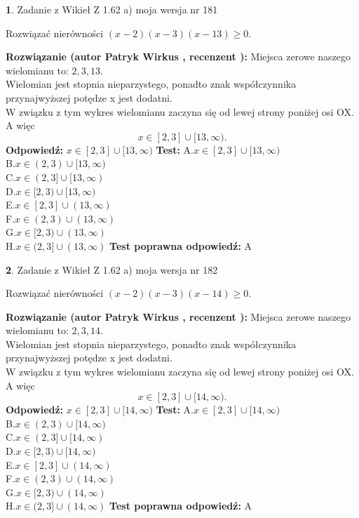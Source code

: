\documentclass[12pt, a4paper]{article}
\theoremstyle{definition} %
\newtheorem{zad}{}
\newcommand{\zadStart}[1]{\begin{zad}#1\newline}
\newcommand{\zadStop}{\end{zad}}
\newcommand{\rozwStart}[2]{\noindent \textbf{Rozwiązanie (autor #1 , recenzent #2): }\newline}
\newcommand{\rozwStop}{\newline}
\newcommand{\odpStart}{\noindent \textbf{Odpowiedź:}\newline}
\newcommand{\odpStop}{\newline}
\newcommand{\testStart}{\noindent \textbf{Test:}\newline}
\newcommand{\testStop}{\newline}
\newcommand{\kluczStart}{\noindent \textbf{Test poprawna odpowiedź:}\newline}
\newcommand{\kluczStop}{\newline}
\begin{document}
\zadStart{Zadanie z Wikieł Z 1.62 a) moja wersja nr 181}

Rozwiązać nierówności $(x-2)(x-3)(x-13)\ge0$.
\zadStop
\rozwStart{Patryk Wirkus}{}
Miejsca zerowe naszego wielomianu to: $2, 3, 13$.\\
Wielomian jest stopnia nieparzystego, ponadto znak współczynnika przy\linebreak najwyższej potędze x jest dodatni.\\ W związku z tym wykres wielomianu zaczyna się od lewej strony poniżej osi OX. A więc $$x \in [2,3] \cup [13,\infty).$$
\rozwStop
\odpStart
$x \in [2,3] \cup [13,\infty)$
\odpStop
\testStart
A.$x \in [2,3] \cup [13,\infty)$\\
B.$x \in (2,3) \cup [13,\infty)$\\
C.$x \in (2,3] \cup [13,\infty)$\\
D.$x \in [2,3) \cup [13,\infty)$\\
E.$x \in [2,3] \cup (13,\infty)$\\
F.$x \in (2,3) \cup (13,\infty)$\\
G.$x \in [2,3) \cup (13,\infty)$\\
H.$x \in (2,3] \cup (13,\infty)$
\testStop
\kluczStart
A
\kluczStop



\zadStart{Zadanie z Wikieł Z 1.62 a) moja wersja nr 182}

Rozwiązać nierówności $(x-2)(x-3)(x-14)\ge0$.
\zadStop
\rozwStart{Patryk Wirkus}{}
Miejsca zerowe naszego wielomianu to: $2, 3, 14$.\\
Wielomian jest stopnia nieparzystego, ponadto znak współczynnika przy\linebreak najwyższej potędze x jest dodatni.\\ W związku z tym wykres wielomianu zaczyna się od lewej strony poniżej osi OX. A więc $$x \in [2,3] \cup [14,\infty).$$
\rozwStop
\odpStart
$x \in [2,3] \cup [14,\infty)$
\odpStop
\testStart
A.$x \in [2,3] \cup [14,\infty)$\\
B.$x \in (2,3) \cup [14,\infty)$\\
C.$x \in (2,3] \cup [14,\infty)$\\
D.$x \in [2,3) \cup [14,\infty)$\\
E.$x \in [2,3] \cup (14,\infty)$\\
F.$x \in (2,3) \cup (14,\infty)$\\
G.$x \in [2,3) \cup (14,\infty)$\\
H.$x \in (2,3] \cup (14,\infty)$
\testStop
\kluczStart
A
\kluczStop
\end{document}
